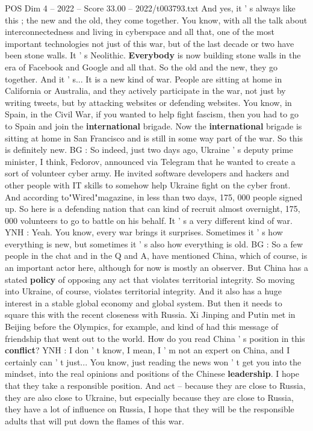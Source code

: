 \begin{textsample}{POS Dim 4 – 2022 – Score 33.00 – 2022/t003793.txt}
And yes, it ' s always like this ; the new and the old, they come together.
You know, with all the talk about interconnectedness and living in cyberspace and all that, one of the most important technologies not just of this war, but of the last decade or two have been stone walls.
It ' s Neolithic. \textbf{Everybody} is now building stone walls in the era of Facebook and Google and all that.
So the old and the new, they go together.
And it ' s...
It is a new kind of war.
People are sitting at home in California or Australia, and they actively participate in the war, not just by writing tweets, but by attacking websites or defending websites.
You know, in Spain, in the Civil War, if you wanted to help fight fascism, then you had to go to Spain and join the \textbf{international} brigade.
Now the \textbf{international} brigade is sitting at home in San Francisco and is still in some way part of the war.
So this is definitely new.
BG : So indeed, just two days ago, Ukraine ' s deputy prime minister, I think, Fedorov, announced via Telegram that he wanted to create a sort of volunteer cyber army.
He invited software developers and hackers and other people with IT skills to somehow help Ukraine fight on the cyber front.
And according to"Wired"magazine, in less than two days, 175, 000 people signed up.
So here is a defending nation that can kind of recruit almost overnight, 175, 000 volunteers to go to battle on his behalf.
It ' s a very different kind of war.
YNH : Yeah.
You know, every war brings it surprises.
Sometimes it ' s how everything is new, but sometimes it ' s also how everything is old.
BG : So a few people in the chat and in the Q and A, have mentioned China, which of course, is an important actor here, although for now is mostly an observer.
But China has a stated \textbf{policy} of opposing any act that violates territorial integrity.
So moving into Ukraine, of course, violates territorial integrity.
And it also has a huge interest in a stable global economy and global system.
But then it needs to square this with the recent closeness with Russia.
Xi Jinping and Putin met in Beijing before the Olympics, for example, and kind of had this message of friendship that went out to the world.
How do you read China ' s position in this \textbf{conflict}?
YNH : I don ' t know, I mean, I ' m not an expert on China, and I certainly can ' t just...
You know, just reading the news won ' t get you into the mindset, into the real opinions and positions of the Chinese \textbf{leadership}.
I hope that they take a responsible position.
And act -- because they are close to Russia, they are also close to Ukraine, but especially because they are close to Russia, they have a lot of influence on Russia, I hope that they will be the responsible adults that will put down the flames of this war.

\end{textsample}
